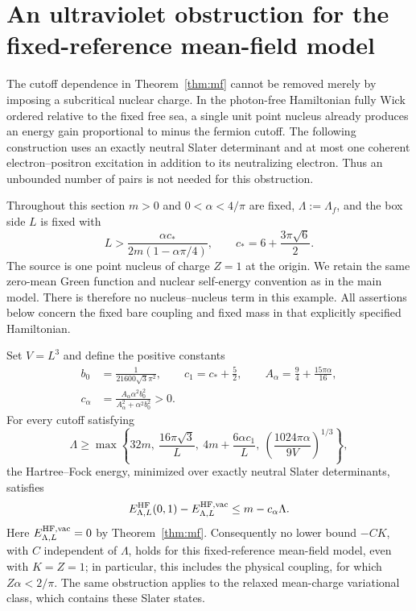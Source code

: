 \section{An ultraviolet obstruction for the fixed-reference mean-field model}
\label{uv-section}

The cutoff dependence in Theorem~\ref{thm:mf} cannot be removed merely by
imposing a subcritical nuclear charge.  In the photon-free Hamiltonian fully
Wick ordered relative to the fixed free sea, a single unit point nucleus
already produces an energy gain proportional to minus the fermion cutoff.
The following construction uses an exactly neutral Slater determinant and
at most one coherent electron--positron excitation in addition to its
neutralizing electron.  Thus an unbounded number of pairs is not needed for
this obstruction.

Throughout this section $m>0$ and $0<\alpha<4/\pi$ are fixed,
$\Lambda:=\Lambda_f$, and the box side $L$ is fixed with
\begin{equation}
 L>\frac{\alpha c_*}{2m(1-\alpha\pi/4)},
 \qquad c_*=6+\frac{3\pi\sqrt6}{2}.
 \label{uv-box-range}
\end{equation}
The source is one point nucleus of charge $Z=1$ at the origin.  We retain the
same zero-mean Green function and nuclear self-energy convention as in the
main model.  There is therefore no nucleus--nucleus term in this example.
All assertions below concern the fixed bare coupling and fixed mass in
that explicitly specified Hamiltonian.

\begin{theorem}
\label{uv-theorem}
Set $V=L^3$ and define the positive constants
\begin{align}
 b_0&=\frac1{21600\sqrt3\pi^2},\qquad
 c_1=c_*+\frac52,\qquad
 A_\alpha=\frac94+\frac{15\pi\alpha}{16},\nonumber\\
 c_\alpha&=\frac{A_\alpha\alpha^2b_0^2}
                    {A_\alpha^2+\alpha^2b_0^2}>0.
 \label{uv-constants}
\end{align}
For every cutoff satisfying
\begin{equation}
 \Lambda\ge\max\left\{
 32m,\ \frac{16\pi\sqrt3}{L},\
 4m+\frac{6\alpha c_1}{L},\
 \left(\frac{1024\pi\alpha}{9V}\right)^{1/3}
 \right\},
 \label{uv-cutoff-threshold}
\end{equation}
the Hartree--Fock energy, minimized over exactly neutral Slater determinants,
satisfies
\begin{equation}
 E^{\rm HF}_{\Lambda,L}(0,1)
       -E^{\rm HF,\mathrm{vac}}_{\Lambda,L}
 \le m-c_\alpha\Lambda.
 \label{uv-linear-collapse}
\end{equation}
Here $E^{\rm HF,\mathrm{vac}}_{\Lambda,L}=0$ by Theorem~\ref{thm:mf}.
Consequently no lower bound $-CK$, with $C$ independent of $\Lambda$, holds
for this fixed-reference mean-field model, even with $K=Z=1$; in particular,
this includes the physical coupling, for which $Z\alpha<2/\pi$.
The same obstruction applies to the relaxed mean-charge
variational class, which contains these Slater states.
\end{theorem}

